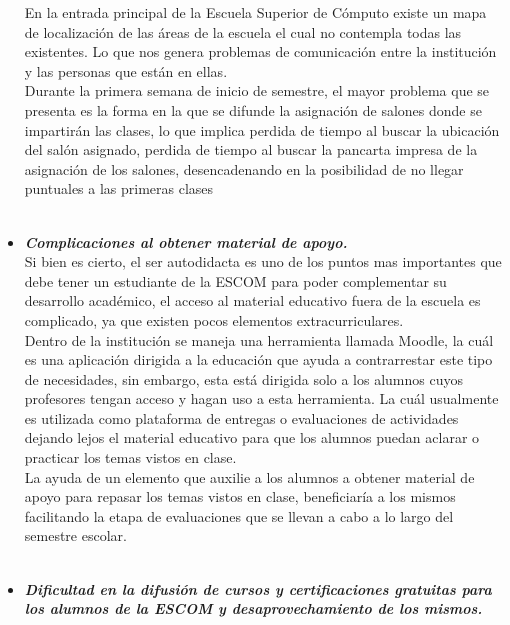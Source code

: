 \begin{itemize}
		En la entrada principal de la Escuela Superior de Cómputo existe un mapa de localización de las áreas de la escuela el cual no contempla todas las existentes.  Lo que nos genera problemas de comunicación entre la institución y las personas que están en ellas. \\ 
		
		 Durante la primera semana de inicio de semestre, el mayor problema que se presenta es la forma en la que se difunde la asignación de salones donde se impartirán las clases, lo que implica perdida de tiempo al buscar la ubicación del salón asignado, perdida de tiempo al buscar la pancarta impresa de la asignación de los salones, desencadenando en la posibilidad de no llegar puntuales a las primeras clases\\ \\
		
		\item \textbf{\textit{Complicaciones al obtener material de apoyo.}} \\
		
		Si bien es cierto, el ser autodidacta es uno de los puntos mas importantes que debe tener un estudiante de la ESCOM para poder complementar su desarrollo académico, el  acceso al material educativo fuera de la escuela es complicado, ya que existen pocos elementos extracurriculares.\\
		
		Dentro de la institución se maneja una herramienta llamada Moodle, la cuál es una aplicación dirigida a la educación que ayuda a contrarrestar este tipo de necesidades, sin embargo, esta está dirigida solo a los alumnos cuyos profesores tengan acceso y hagan uso a esta herramienta. La cuál usualmente es utilizada como plataforma de entregas o evaluaciones de actividades dejando lejos el material educativo para que los alumnos puedan aclarar o practicar los temas vistos en clase. \\
		
		La ayuda de un elemento que auxilie a los alumnos a obtener material de apoyo para repasar los temas vistos en clase, beneficiaría a los mismos facilitando la etapa de evaluaciones que se llevan a cabo a lo largo del semestre escolar.\\ \\
		
		\item \textbf{\textit{Dificultad en la  difusión de cursos y certificaciones gratuitas para los alumnos de la ESCOM y desaprovechamiento de los mismos.}}\\
		

\end{itemize}
